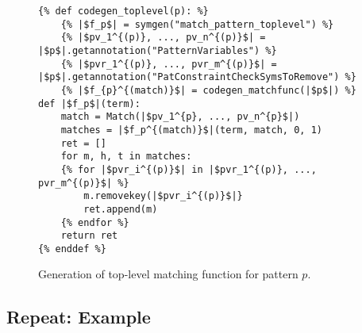 \begin{figure}
\begin{verbatim}
{% def codegen_toplevel(p): %}
	{% |$f_p$| = symgen("match_pattern_toplevel") %}
	{% |$pv_1^{(p)}, ..., pv_n^{(p)}$| = |$p$|.getannotation("PatternVariables") %}
	{% |$pvr_1^{(p)}, ..., pvr_m^{(p)}$| = |$p$|.getannotation("PatConstraintCheckSymsToRemove") %}
	{% |$f_{p}^{(match)}$| = codegen_matchfunc(|$p$|) %}
def |$f_p$|(term):
	match = Match(|$pv_1^{p}, ..., pv_n^{p}$|)
	matches = |$f_p^{(match)}$|(term, match, 0, 1)
	ret = []
	for m, h, t in matches:
	{% for |$pvr_i^{(p)}$| in |$pvr_1^{(p)}, ..., pvr_m^{(p)}$| %}
		m.removekey(|$pvr_i^{(p)}$|}
		ret.append(m)
	{% endfor %}
	return ret
{% enddef %}
\end{verbatim}
\caption{Generation of top-level matching function for pattern $p$.}
\label{pat-toplevel}
\end{figure}

\subsection{Repeat: Example}

